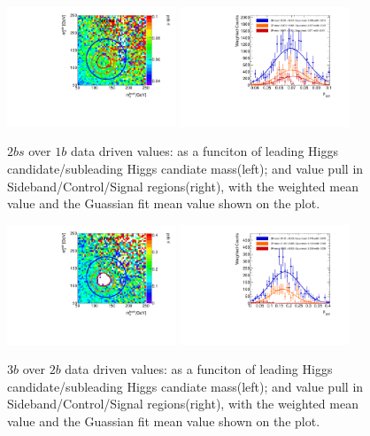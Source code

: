 \begin{figure}[htbp!]
\begin{center}
\includegraphics[width=0.45\textwidth,angle=-90]{figures/boosted/AppendixMuqcdstudy/TwoTag_split_Incl_mH0H1.pdf}
\includegraphics[width=0.45\textwidth,angle=-90]{figures/boosted/AppendixMuqcdstudy/TwoTag_split_Incl_mH0H1_pull.pdf}
\caption{$2bs$ over $1b$ data driven \muqcd values: \muqcd as a funciton of leading Higgs candidate/subleading Higgs candiate mass(left); and \muqcd value pull in Sideband/Control/Signal regions(right), with the weighted mean value and the Guassian fit mean value shown on the plot.}
\label{fig:app-muqcd-2bs}
\end{center}
\end{figure}

\begin{figure}[htbp!]
\begin{center}
\includegraphics[width=0.45\textwidth,angle=-90]{figures/boosted/AppendixMuqcdstudy/ThreeTag_Incl_mH0H1.pdf}
\includegraphics[width=0.45\textwidth,angle=-90]{figures/boosted/AppendixMuqcdstudy/ThreeTag_Incl_mH0H1_pull.pdf}
\caption{$3b$ over $2b$ data driven \muqcd values: \muqcd as a funciton of leading Higgs candidate/subleading Higgs candiate mass(left); and \muqcd value pull in Sideband/Control/Signal regions(right), with the weighted mean value and the Guassian fit mean value shown on the plot.}
\label{fig:app-muqcd-3b}
\end{center}
\end{figure}

